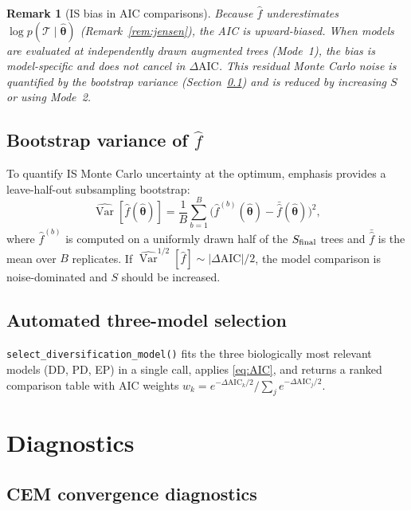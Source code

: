 \documentclass[12pt,a4paper]{article}
\newtheorem{remark}{Remark}
\newcommand{\obs}{\mathcal{T}}
\newcommand{\pars}{\bm{\theta}}
\newcommand{\fhat}{\widehat{f}}
\newcommand{\AIC}{\mathrm{AIC}}
\DeclareMathOperator{\Var}{Var}
\begin{document}
\begin{remark}[IS bias in AIC comparisons]\label{rem:aicbias}
Because $\fhat$ underestimates $\log p(\obs\mid\hat{\pars})$
(Remark~\ref{rem:jensen}), the AIC is upward-biased. When models are
evaluated at independently drawn augmented trees (Mode~1), the bias is
model-specific and does not cancel in $\Delta\AIC$. This residual Monte
Carlo noise is quantified by the bootstrap variance
(Section~\ref{sec:bootvar}) and is reduced by increasing $S$ or using
Mode~2.
\end{remark}

\subsection{Bootstrap variance of $\fhat$}\label{sec:bootvar}

To quantify IS Monte Carlo uncertainty at the optimum, \textsf{emphasis}
provides a leave-half-out subsampling bootstrap:
\begin{equation}\label{eq:bootvar}
  \widehat{\Var}[\fhat(\hat{\pars})] = \frac{1}{B} \sum_{b=1}^{B}
    \bigl(\fhat^{(b)}(\hat{\pars}) - \bar{\fhat}(\hat{\pars})\bigr)^2,
\end{equation}
where $\fhat^{(b)}$ is computed on a uniformly drawn half of the
$S_{\rm final}$ trees and $\bar{\fhat}$ is the mean over $B$ replicates.
If $\widehat{\Var}^{1/2}[\fhat] \sim |\Delta\AIC|/2$, the model comparison
is noise-dominated and $S$ should be increased.

\subsection{Automated three-model selection}

\texttt{select\_diversification\_model()} fits the three biologically most
relevant models (DD, PD, EP) in a single call, applies \eqref{eq:AIC}, and
returns a ranked comparison table with AIC weights
$w_k = e^{-\Delta\AIC_k/2} / \sum_j e^{-\Delta\AIC_j/2}$.

\section{Diagnostics}\label{sec:diagnostics}

\subsection{CEM convergence diagnostics}
\end{document}
